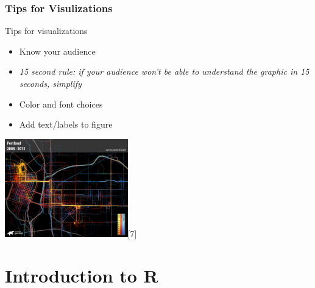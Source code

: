 \section{Tips for Visulizations}
\begin{frame}
	\begin{center}
  		\begin{block}{Tips for visualizations} 
			\begin{itemize}
				\item Know your audience 
				\item \itshape{ 15 second rule:} \normalfont if your audience won't be able to understand the graphic in 15 seconds, simplify
				\item Color and font choices
				\item Add text/labels to figure
			\end{itemize}		
		\end{block}
	\end{center} 

  \begin{center}
  	\includegraphics[width=0.4\textwidth]{images/geolocation_ex}[7]
  \end{center}

\end{frame}




\part{Introduction to R}

